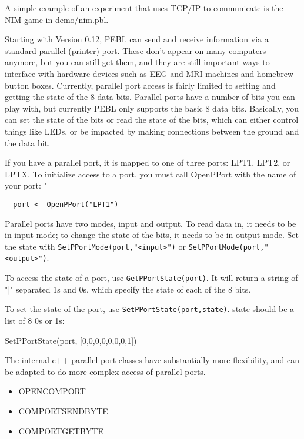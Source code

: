 A simple example of an experiment that uses TCP/IP to communicate is
the NIM game in  demo/nim.pbl.



Starting with Version 0.12, PEBL can send and receive information via a standard parallel (printer) port.    These don't appear on many computers anymore, but you can still get them, and they are still important ways to interface with hardware devices such as EEG and MRI machines and homebrew button boxes.  Currently, parallel port access is fairly limited to setting and getting the state of the 8 data bits.  Parallel ports have a number of bits you can play with, but currently PEBL only supports the basic 8 data bits.  Basically, you can set the state of the bits or read the state of the bits, which can either control things like LEDs, or be impacted by making connections between the ground and the data bit.


If you have a parallel port, it is mapped to one of three ports: LPT1, LPT2, or LPTX.  To initialize access to a port, you must call OpenPPort with the name of your port:
"
\begin{verbatim}
  port <- OpenPPort("LPT1")
\end{verbatim}

Parallel ports have two modes, input and output.  To read data in, it needs to be in input mode; to change the state of the bits, it needs to be in output mode.  Set the state with \texttt{SetPPortMode(port,"<input>")} or \texttt{SetPPortMode(port,"<output>")}.

To access the state of a port, use \texttt{GetPPortState(port)}.  It will return a string of "|" separated 1s and 0s, which specify the state of each of the 8 bits.

To set the state of the port, use \texttt{SetPPortState(port,state)}.  state should be a list of 8 0s or 1s:

SetPPortState(port, [0,0,0,0,0,0,0,1])

The internal c++ parallel port classes have substantially more flexibility, and can be adapted to do more complex access of parallel ports.




\begin{itemize}
\item OPENCOMPORT
\item COMPORTSENDBYTE
\item COMPORTGETBYTE
\end{itemize}


